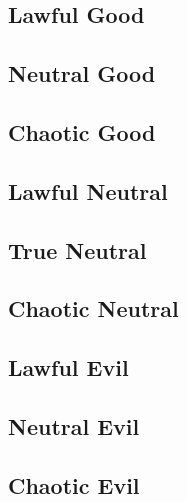 \subsection{Lawful Good}
\subsection{Neutral Good}
\subsection{Chaotic Good}
\subsection{Lawful Neutral}
\subsection{True Neutral}
\subsection{Chaotic Neutral}
\subsection{Lawful Evil}
\subsection{Neutral Evil}
\subsection{Chaotic Evil}
